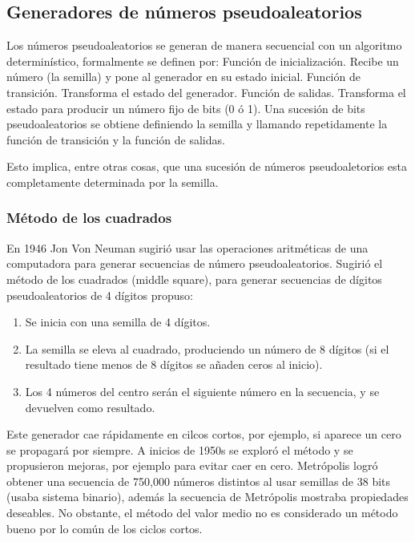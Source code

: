 \documentclass{article}
\begin{document}
\subsection{Generadores de números pseudoaleatorios}

Los números pseudoaleatorios se generan de manera
secuencial con un algoritmo determinístico, formalmente se definen por:
Función de inicialización. Recibe un número (la semilla) y pone al generador en su estado inicial.
Función de transición. Transforma el estado del generador.
Función de salidas. Transforma el estado para producir un número fijo de bits (0 ó 1).
Una sucesión de bits pseudoaleatorios se obtiene definiendo la semilla y llamando repetidamente la función de transición y la función de salidas.

Esto implica, entre otras cosas, que una sucesión de números pseudoaletorios esta completamente determinada por la semilla.

\subsubsection{Método de los cuadrados}

En 1946 Jon Von Neuman sugirió usar las operaciones aritméticas de una computadora para
generar secuencias de número pseudoaleatorios.
Sugirió el método de los cuadrados (middle square), para generar secuencias de dígitos pseudoaleatorios de 4
dígitos propuso:

\begin{enumerate}
    \item Se inicia con una semilla de 4 dígitos. 
    \item La semilla se eleva al cuadrado, produciendo un número de 8 dígitos (si el resultado tiene menos de 8 dígitos se añaden ceros al inicio). 
    \item Los 4 números del centro serán el siguiente número en la secuencia, y se devuelven
como resultado.
\end{enumerate}

Este generador cae rápidamente en cilcos cortos, por ejemplo, si aparece un cero se propagará por siempre.
A inicios de 1950s se exploró el método y se propusieron mejoras, por ejemplo para evitar caer en cero. Metrópolis logró obtener una secuencia de 750,000 números distintos al usar
semillas de 38 bits (usaba sistema binario), además la secuencia de Metrópolis mostraba propiedades deseables. No obstante, el método del valor medio no es considerado un método bueno por lo común de los ciclos cortos.
\end{document}
